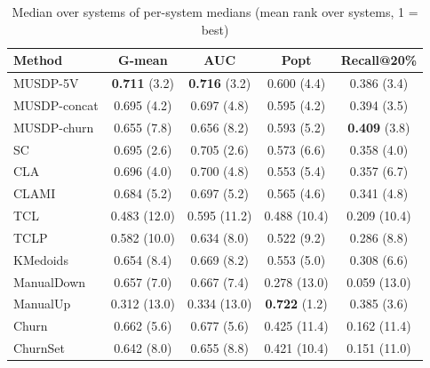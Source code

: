\begin{table}[t]
\centering
\caption{Median over systems of per-system medians (mean rank over systems, 1 = best)}
\label{tab:aeeem-overall}
\setlength{\tabcolsep}{2pt}
\scriptsize
\begin{tabular}{lcccc}
\hline
Method & G-mean & AUC & Popt & Recall@20\% \\
\hline
MUSDP-5V     & \textbf{0.711} (3.2) & \textbf{0.716} (3.2) & 0.600 (4.4) & 0.386 (3.4) \\
MUSDP-concat & 0.695 (4.2) & 0.697 (4.8) & 0.595 (4.2) & 0.394 (3.5) \\
MUSDP-churn  & 0.655 (7.8) & 0.656 (8.2) & 0.593 (5.2) & \textbf{0.409} (3.8) \\
SC           & 0.695 (2.6) & 0.705 (2.6) & 0.573 (6.6) & 0.358 (4.0) \\
CLA          & 0.696 (4.0) & 0.700 (4.8) & 0.553 (5.4) & 0.357 (6.7) \\
CLAMI        & 0.684 (5.2) & 0.697 (5.2) & 0.565 (4.6) & 0.341 (4.8) \\
TCL          & 0.483 (12.0) & 0.595 (11.2) & 0.488 (10.4) & 0.209 (10.4) \\
TCLP         & 0.582 (10.0) & 0.634 (8.0) & 0.522 (9.2) & 0.286 (8.8) \\
KMedoids     & 0.654 (8.4) & 0.669 (8.2) & 0.553 (5.0) & 0.308 (6.6) \\
ManualDown   & 0.657 (7.0) & 0.667 (7.4) & 0.278 (13.0) & 0.059 (13.0) \\
ManualUp     & 0.312 (13.0) & 0.334 (13.0) & \textbf{0.722} (1.2) & 0.385 (3.6) \\
Churn        & 0.662 (5.6) & 0.677 (5.6) & 0.425 (11.4) & 0.162 (11.4) \\
ChurnSet     & 0.642 (8.0) & 0.655 (8.8) & 0.421 (10.4) & 0.151 (11.0) \\
\hline
\end{tabular}
\end{table}

